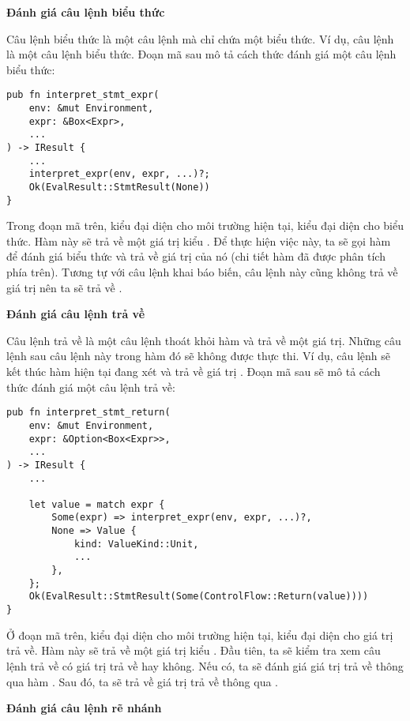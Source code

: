 \noindent \textbf{Đánh giá câu lệnh biểu thức}

    Câu lệnh biểu thức là một câu lệnh mà chỉ chứa một biểu thức. Ví dụ, câu lệnh  là một câu lệnh biểu thức. Đoạn mã sau mô tả cách thức đánh giá một câu lệnh biểu thức:

\begin{lstlisting}[]
pub fn interpret_stmt_expr(
    env: &mut Environment,
    expr: &Box<Expr>,
    ...
) -> IResult {
    ...
    interpret_expr(env, expr, ...)?;
    Ok(EvalResult::StmtResult(None))
}
\end{lstlisting}

    Trong đoạn mã trên,  kiểu  đại diện cho môi trường hiện tại,  kiểu  đại diện cho biểu thức. Hàm này sẽ trả về một giá trị kiểu . Để thực hiện việc này, ta sẽ gọi hàm  để đánh giá biểu thức và trả về giá trị của nó (chi tiết hàm đã được phân tích phía trên). Tương tự với câu lệnh khai báo biến, câu lệnh này cũng không trả về giá trị nên ta sẽ trả về .

\noindent \textbf{Đánh giá câu lệnh trả về}

Câu lệnh trả về là một câu lệnh thoát khỏi hàm và trả về một giá trị. Những câu lệnh sau câu lệnh này trong hàm đó sẽ không được thực thi. Ví dụ, câu lệnh  sẽ kết thúc hàm hiện tại đang xét và trả về giá trị . Đoạn mã sau sẽ mô tả cách thức đánh giá một câu lệnh trả về:

\begin{lstlisting}[]
pub fn interpret_stmt_return(
    env: &mut Environment,
    expr: &Option<Box<Expr>>,
    ...
) -> IResult {
    ...

    let value = match expr {
        Some(expr) => interpret_expr(env, expr, ...)?,
        None => Value {
            kind: ValueKind::Unit,
            ...
        },
    };
    Ok(EvalResult::StmtResult(Some(ControlFlow::Return(value))))
}
\end{lstlisting}

    Ở đoạn mã trên,  kiểu  đại diện cho môi trường hiện tại, kiểu  đại diện cho giá trị trả về. Hàm này sẽ trả về một giá trị kiểu . Đầu tiên, ta sẽ kiểm tra xem câu lệnh trả về có giá trị trả về hay không. Nếu có, ta sẽ đánh giá giá trị trả về thông qua hàm . Sau đó, ta sẽ trả về giá trị trả về thông qua . 

\noindent \textbf{Đánh giá câu lệnh rẽ nhánh}

